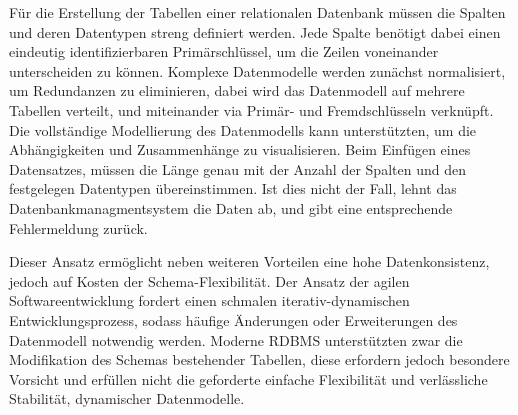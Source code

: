 Für die Erstellung der Tabellen einer relationalen Datenbank müssen die Spalten und deren Datentypen streng definiert werden. Jede Spalte benötigt dabei einen eindeutig identifizierbaren Primärschlüssel, um die Zeilen voneinander unterscheiden zu können. Komplexe Datenmodelle werden zunächst normalisiert, um Redundanzen zu eliminieren, dabei wird das Datenmodell auf mehrere Tabellen verteilt, und miteinander via Primär- und Fremdschlüsseln verknüpft. Die vollständige Modellierung des Datenmodells kann unterstützten, um die Abhängigkeiten und Zusammenhänge zu visualisieren. Beim Einfügen eines Datensatzes, müssen die Länge genau mit der Anzahl der Spalten und den festgelegen Datentypen übereinstimmen. Ist dies nicht der Fall, lehnt das Datenbankmanagmentsystem die Daten ab, und gibt eine entsprechende Fehlermeldung zurück.

Dieser Ansatz ermöglicht neben weiteren Vorteilen eine hohe Datenkonsistenz, jedoch auf Kosten der Schema-Flexibilität. Der Ansatz der agilen Softwareentwicklung fordert einen schmalen iterativ-dynamischen Entwicklungsprozess, sodass häufige Änderungen oder Erweiterungen des Datenmodell notwendig werden. Moderne RDBMS unterstützten zwar die Modifikation des Schemas bestehender Tabellen, diese erfordern jedoch besondere Vorsicht und erfüllen nicht die geforderte einfache Flexibilität und verlässliche Stabilität, dynamischer Datenmodelle. \cite[S. 197]{harrisonNextGenerationDatabases2015}

\cite{}










